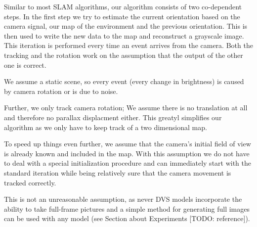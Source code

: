Similar to most SLAM algorithms, our algorithm consists of two co-dependent
steps. In the first step we try to estimate the current orientation based on
the camera signal, our map of the environment and the previous orientation.
This is then used to write the new data to the map and reconstruct a grayscale
image. This iteration is performed every time an event arrives from the camera.
Both the tracking and the rotation work on the assumption that the output  of
the other one is correct.

We assume a static scene, so every event (every change in brightness) is caused
by camera rotation or is due to noise.

Further, we only track camera rotation; We assume there is no translation at
all and therefore no parallax displacment either. This greatyl simplifies our
algorithm as we only have to keep track of a two dimensional map.

To speed up things even further, we assume that the camera's initial field
of view is already known and included in the map. With this assumption we do
not have to deal with a special initialization procedure and can immediately
start with the standard iteration while being relatively sure that the camera
movement is tracked correctly.

This is not an unreasonable assumption, as never DVS models incorporate the
ability to take full-frame pictures and a simple method for generating full
images can be used with any model (see Section about Experiments [TODO:
reference]).